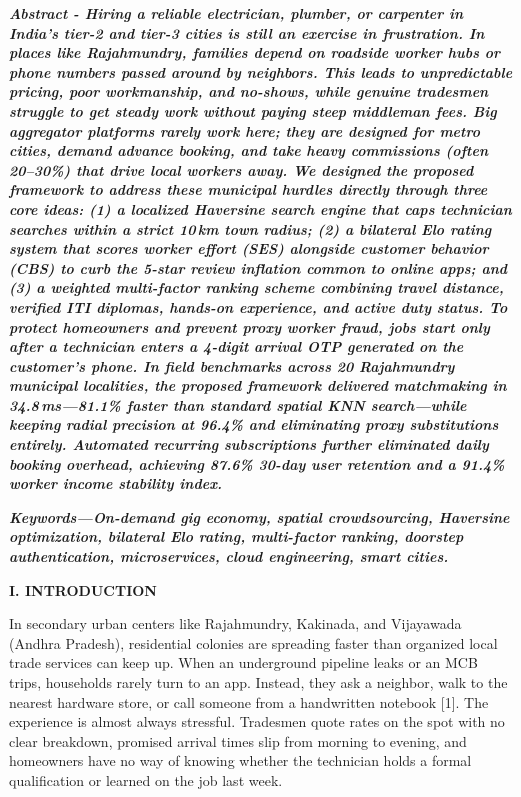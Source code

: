 \documentclass[10pt,twocolumn,a4paper]{article}
\begin{document}
\noindent
\textbf{\textit{Abstract - Hiring a reliable electrician, plumber, or carpenter in India's tier-2 and tier-3 cities is still an exercise in frustration. In places like Rajahmundry, families depend on roadside worker hubs or phone numbers passed around by neighbors. This leads to unpredictable pricing, poor workmanship, and no-shows, while genuine tradesmen struggle to get steady work without paying steep middleman fees. Big aggregator platforms rarely work here; they are designed for metro cities, demand advance booking, and take heavy commissions (often 20--30\%) that drive local workers away. We designed the proposed framework to address these municipal hurdles directly through three core ideas: (1) a localized Haversine search engine that caps technician searches within a strict 10\,km town radius; (2) a bilateral Elo rating system that scores worker effort (SES) alongside customer behavior (CBS) to curb the 5-star review inflation common to online apps; and (3) a weighted multi-factor ranking scheme combining travel distance, verified ITI diplomas, hands-on experience, and active duty status. To protect homeowners and prevent proxy worker fraud, jobs start only after a technician enters a 4-digit arrival OTP generated on the customer's phone. In field benchmarks across 20 Rajahmundry municipal localities, the proposed framework delivered matchmaking in 34.8\,ms---81.1\% faster than standard spatial KNN search---while keeping radial precision at 96.4\% and eliminating proxy substitutions entirely. Automated recurring subscriptions further eliminated daily booking overhead, achieving 87.6\% 30-day user retention and a 91.4\% worker income stability index.}}

\vspace{0.35em}
\noindent
\textbf{\textit{Keywords---On-demand gig economy, spatial crowdsourcing, Haversine optimization, bilateral Elo rating, multi-factor ranking, doorstep authentication, microservices, cloud engineering, smart cities.}}

\vspace{0.5em}

\noindent
\textbf{\large I. INTRODUCTION}

\vspace{0.3em}
In secondary urban centers like Rajahmundry, Kakinada, and Vijayawada (Andhra Pradesh), residential colonies are spreading faster than organized local trade services can keep up. When an underground pipeline leaks or an MCB trips, households rarely turn to an app. Instead, they ask a neighbor, walk to the nearest hardware store, or call someone from a handwritten notebook [1]. The experience is almost always stressful. Tradesmen quote rates on the spot with no clear breakdown, promised arrival times slip from morning to evening, and homeowners have no way of knowing whether the technician holds a formal qualification or learned on the job last week.
\end{document}
